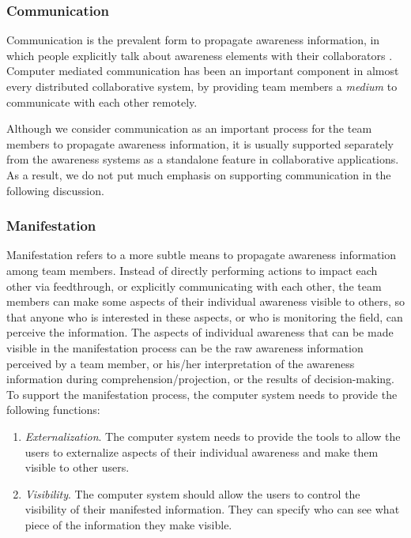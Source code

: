 \subsubsection*{Communication} %
\label{ssub:communication}
Communication is the prevalent form to propagate awareness information, in which people explicitly talk about awareness elements with their collaborators \cite{Gutwin2002}. Computer mediated communication has been an important component in almost every distributed collaborative system, by providing team members a \emph{medium} to communicate with each other remotely.

Although we consider communication as an important process for the team members to propagate awareness information, it is usually supported separately from the awareness systems as a standalone feature in collaborative applications. As a result, we do not put much emphasis on supporting communication in the following discussion.


\subsubsection*{Manifestation} %
\label{ssub:manifestation}
Manifestation refers to a more subtle means to propagate awareness information among team members. Instead of directly performing actions to impact each other via feedthrough, or explicitly communicating with each other, the team members can make some aspects of their individual awareness visible to others, so that anyone who is interested in these aspects, or who is monitoring the field, can perceive the information. The aspects of individual awareness that can be made visible in the manifestation process can be the raw awareness information perceived by a team member, or his/her interpretation of the awareness information during comprehension/projection, or the results of decision-making. To support the manifestation process, the computer system needs to provide the following functions:

\begin{enumerate}
   \item \emph{Externalization}. The computer system needs to provide the tools to allow the users to externalize aspects of their individual awareness and make them visible to other users.
   \item \emph{Visibility}. The computer system should allow the users to control the visibility of their manifested information. They can specify who can see what piece of the information they make visible.
\end{enumerate}

